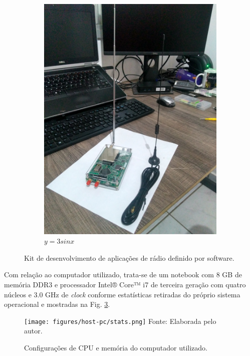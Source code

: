 \documentclass[
  12pt,				%
  openright,			%
  twoside,			%
  a4paper,			%
  english,			%
  french,				%
  spanish,			%
  brazil,				%
  ]{abntex2}
\begin{document}
\begin{figure}[!htb]
\begin{subfigure}[b]{0.45\linewidth}
    \includegraphics[width=\linewidth]{figures/hackrf/hack_rf_kit.jpg}
    \caption{$y=3sinx$}
    \label{fig:hack_rf_kit}
  \end{subfigure}
  \caption{Kit de desenvolvimento de aplicações de rádio definido por software.}
  \label{fig:hack_rf_hdk}
\end{figure}

\newpage
Com relação ao computador utilizado, trata-se de um notebook com 8 GB de memória DDR3 e processador Intel® Core™ i7 de terceira geração com quatro
núcleos e 3.0 GHz de \textit{clock} conforme estatísticas retiradas do próprio sistema operacional e mostradas na Fig. \ref{fig:host_pc_stats}.

\begin{figure}[!htb]
  \centering
  \caption{Configurações de CPU e memória do computador utilizado.}
  \texttt{[image: figures/host-pc/stats.png]}
  Fonte: Elaborada pelo autor.
  \label{fig:host_pc_stats}
\end{figure}
\end{document}
